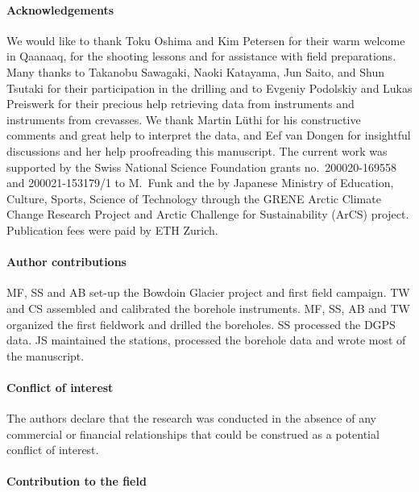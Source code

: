 \documentclass[utf8]{article}
\begin{document}

\paragraph{Acknowledgements}

    We would like to thank Toku Oshima and Kim Petersen for their warm welcome
    in Qaanaaq, for the shooting lessons and for assistance with field
    preparations. Many thanks to Takanobu Sawagaki, Naoki Katayama, Jun Saito,
    and Shun Tsutaki for their participation in the drilling and
    to Evgeniy Podolskiy and Lukas Preiswerk for
    their precious help retrieving data from instruments and instruments from
    crevasses. We thank Martin Lüthi for his constructive comments and great
    help to interpret the data, and Eef van Dongen for insightful discussions
    and her help proofreading this manuscript.
    The current work was supported by the Swiss National Science Foundation
    grants no.~200020-169558 and 200021-153179/1 to M.~Funk and the by Japanese
    Ministry of Education, Culture, Sports, Science of Technology through
    the GRENE Arctic Climate Change Research Project and Arctic Challenge for
    Sustainability (ArCS) project. Publication fees were paid by ETH Zurich.

\paragraph{Author contributions}

    MF, SS and AB set-up the Bowdoin Glacier project and first field campaign.
    TW and CS assembled and calibrated the borehole instruments. MF, SS, AB and
    TW organized the first fieldwork and drilled the boreholes. SS processed
    the DGPS data. JS maintained the stations, processed the borehole data and
    wrote most of the manuscript.

\paragraph{Conflict of interest}

    The authors declare that the research was conducted in the absence of any
    commercial or financial relationships that could be construed as a
    potential conflict of interest.

\paragraph{Contribution to the field}
\end{document}

